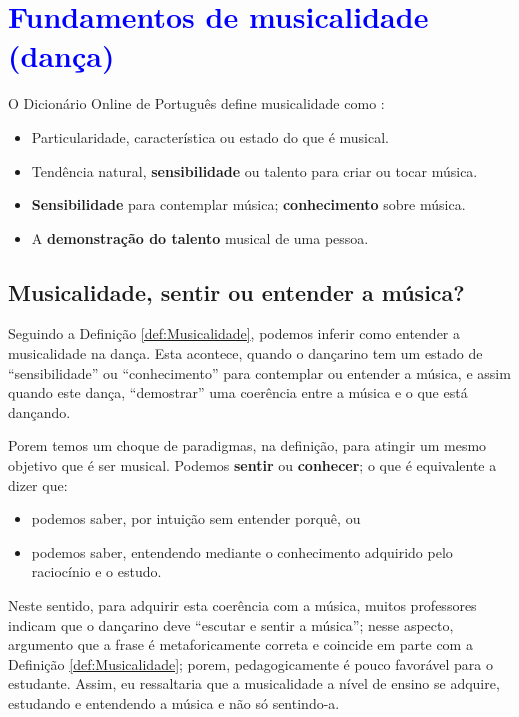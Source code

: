 
\chapter{\textcolor{blue}{Fundamentos de musicalidade (dança)}}

\begin{definition}[Musicalidade:] 
\label{def:Musicalidade}
O Dicionário Online de Português define musicalidade como \cite{diciomusicalidade}:
\begin{itemize}
\item Particularidade, característica ou estado do que é musical.
\item Tendência natural, \textbf{sensibilidade} ou talento para criar ou tocar música.
\item \textbf{Sensibilidade} para contemplar música; \textbf{conhecimento} sobre música.
\item A \textbf{demonstração do talento} musical de uma pessoa.
\end{itemize}
\end{definition}

\section{Musicalidade, sentir ou entender a música?}
Seguindo a Definição \ref{def:Musicalidade}, podemos inferir como entender a musicalidade na dança.
Esta acontece, quando o dançarino tem um estado de ``sensibilidade'' ou ``conhecimento'' para contemplar ou entender a música,
e assim quando este dança, ``demostrar'' uma coerência entre a música e o que está dançando.

Porem temos um choque de paradigmas, na definição, para atingir um mesmo objetivo que é ser musical.
Podemos \textbf{sentir} ou \textbf{conhecer}; o que é equivalente a dizer que:
\begin{itemize} 
\item podemos saber, por intuição sem entender porquê, ou
\item podemos saber, entendendo mediante o conhecimento adquirido pelo raciocínio e o estudo.\\
\end{itemize}



Neste sentido, para adquirir esta coerência com a música, 
muitos professores indicam que o dançarino deve ``escutar e sentir a música'';
nesse aspecto, argumento que a frase é metaforicamente correta e coincide em parte com a Definição \ref{def:Musicalidade};
porem, pedagogicamente  é pouco favorável para o estudante.
Assim, eu ressaltaria que a musicalidade a nível de ensino se adquire,
estudando e entendendo a música e não só sentindo-a.
 
